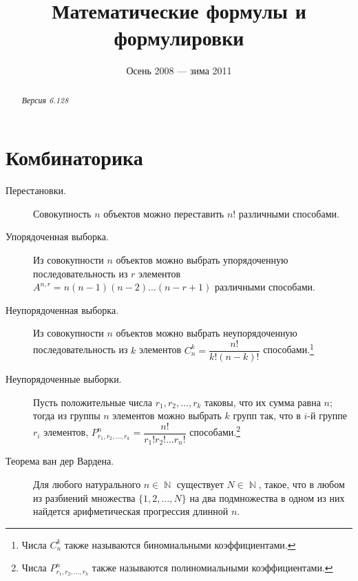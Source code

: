 \documentclass[a4paper,12pt]{scrartcl}
\title{Математические формулы и формулировки}
\author{}
\date{Осень 2008 --- зима 2011}
\DeclareMathOperator{\bbn}{\mathbb{N}}
\begin{document}
\maketitle

\begin{abstract}
\emph{Версия 6.128}
\end{abstract}

\begin{scriptsize}\tableofcontents\end{scriptsize}

\section{Комбинаторика}
\begin{description}
\item[Перестановки.] Совокупность $n$ объектов можно переставить $n!$ различными способами.
\item[Упорядоченная выборка.] Из совокупности $n$ объектов можно выбрать упорядоченную последовательность из $r$ элементов $A^{n,r} = n(n-1)(n-2)\ldots(n-r+1)$ различными способами.
\item[Неупорядоченная выборка.] Из совокупности $n$ объектов можно выбрать неупорядоченную последовательность из $k$ элементов $C_{n}^{k} = \dfrac{n!}{k!(n-k)!}$ способами.\footnote{Числа $C_{n}^{k}$ также называются биномиальными коэффициентами.}
\item[Неупорядоченные выборки.] Пусть положительные числа $r_1,r_2,\ldots,r_k$ таковы, что их сумма равна $n$; тогда из группы $n$ элементов можно выбрать $k$ групп так, что в $i$-й группе $r_i$ элементов, $P^{n}_{r_1,r_2,\ldots,r_k} = \dfrac{n!}{r_1!r_2!\ldots r_n!}$ способами.\footnote{Числа $P^{n}_{r_1,r_2,\ldots,r_k}$ также называются полиномиальными коэффициентами.}
\item[Теорема ван дер Вардена.] Для любого натурального $n\in \bbn$ существует $N\in\bbn$, такое, что в любом из разбиений множества $\{1,2,\ldots,N\}$ на два подмножества в одном из них найдется арифметическая прогрессия длинной $n$.
\end{description}
\end{document}
